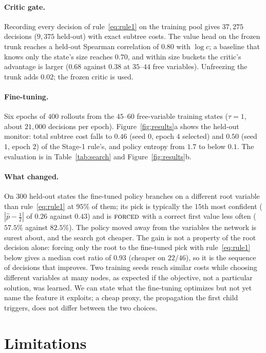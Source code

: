 \documentclass[final,5p,times,twocolumn]{elsarticle}
\newcommand{\FORCED}{\textsc{forced}}
\begin{document}
\paragraph{Critic gate.} Recording every decision of rule~\eqref{eq:rule1} on the training pool gives $37{,}275$ decisions ($9{,}375$ held-out) with exact subtree costs. The value head on the frozen trunk reaches a held-out Spearman correlation of $0.80$ with $\log c$; a baseline that knows only the state's size reaches $0.70$, and within size buckets the critic's advantage is larger ($0.68$ against $0.38$ at $35$--$44$ free variables). Unfreezing the trunk adds $0.02$; the frozen critic is used.

\paragraph{Fine-tuning.} Six epochs of $400$ rollouts from the $45$--$60$ free-variable training states ($\tau=1$, about $21{,}000$ decisions per epoch). Figure~\ref{fig:results}a shows the held-out monitor: total subtree cost falls to $0.46$ (seed $0$, epoch $4$ selected) and $0.50$ (seed $1$, epoch $2$) of the Stage-1 rule's, and policy entropy from $1.7$ to below $0.1$. The evaluation is in Table~\ref{tab:search} and Figure~\ref{fig:results}b.

\paragraph{What changed.} On $300$ held-out states the fine-tuned policy branches on a different root variable than rule~\eqref{eq:rule1} at $95\%$ of them; its pick is typically the $15$th most confident ($|\hat p-\frac12|$ of $0.26$ against $0.43$) and is $\FORCED$ with a correct first value less often ($57.5\%$ against $82.5\%$). The policy moved away from the variables the network is surest about, and the search got cheaper. The gain is not a property of the root decision alone: forcing only the root to the fine-tuned pick with rule~\eqref{eq:rule1} below gives a median cost ratio of $0.93$ (cheaper on $22/46$), so it is the sequence of decisions that improves. Two training seeds reach similar costs while choosing different variables at many nodes, as expected if the objective, not a particular solution, was learned. We can state what the fine-tuning optimizes but not yet name the feature it exploits; a cheap proxy, the propagation the first child triggers, does not differ between the two choices.

\section{Limitations}
\label{sec:limits}
\end{document}
